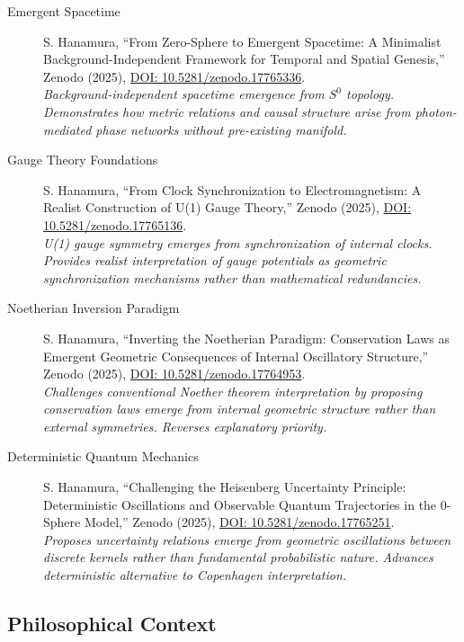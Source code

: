 \documentclass[12pt,letterpaper]{article}
\begin{document}
\begin{description}
\item[Emergent Spacetime] S. Hanamura, ``From Zero-Sphere to Emergent Spacetime: A Minimalist Background-Independent Framework for Temporal and Spatial Genesis,'' Zenodo (2025), \href{https://doi.org/10.5281/zenodo.17765336}{DOI: 10.5281/zenodo.17765336}. \\
\textit{Background-independent spacetime emergence from $S^0$ topology. Demonstrates how metric relations and causal structure arise from photon-mediated phase networks without pre-existing manifold.}

\item[Gauge Theory Foundations] S. Hanamura, ``From Clock Synchronization to Electromagnetism: A Realist Construction of U(1) Gauge Theory,'' Zenodo (2025), \href{https://doi.org/10.5281/zenodo.17765136}{DOI: 10.5281/zenodo.17765136}. \\
\textit{U(1) gauge symmetry emerges from synchronization of internal clocks. Provides realist interpretation of gauge potentials as geometric synchronization mechanisms rather than mathematical redundancies.}

\item[Noetherian Inversion Paradigm] S. Hanamura, ``Inverting the Noetherian Paradigm: Conservation Laws as Emergent Geometric Consequences of Internal Oscillatory Structure,'' Zenodo (2025), \href{https://doi.org/10.5281/zenodo.17764953}{DOI: 10.5281/zenodo.17764953}. \\
\textit{Challenges conventional Noether theorem interpretation by proposing conservation laws emerge from internal geometric structure rather than external symmetries. Reverses explanatory priority.}

\item[Deterministic Quantum Mechanics] S. Hanamura, ``Challenging the Heisenberg Uncertainty Principle: Deterministic Oscillations and Observable Quantum Trajectories in the 0-Sphere Model,'' Zenodo (2025), \href{https://doi.org/10.5281/zenodo.17765251}{DOI: 10.5281/zenodo.17765251}. \\
\textit{Proposes uncertainty relations emerge from geometric oscillations between discrete kernels rather than fundamental probabilistic nature. Advances deterministic alternative to Copenhagen interpretation.}
\end{description}

\subsection*{Philosophical Context}
\end{document}
